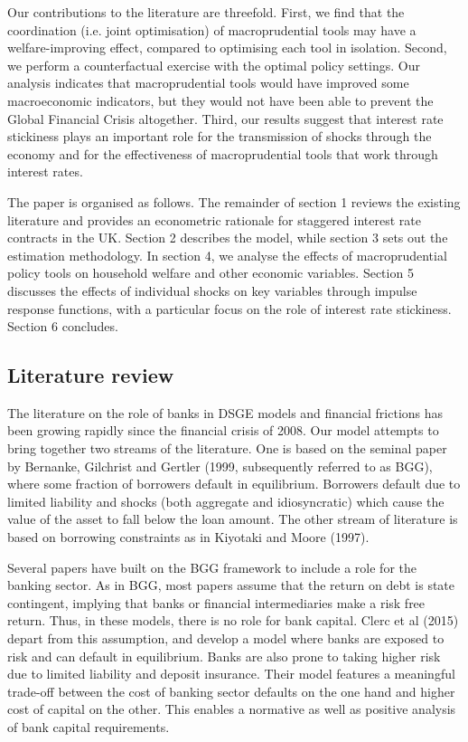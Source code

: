 \documentclass[12pt]{article}
\numberwithin{equation}{section}
\begin{document}
Our contributions to the literature are threefold. First, we find that the coordination (i.e. joint optimisation) of macroprudential tools may have a welfare-improving effect, compared to optimising each tool in isolation. Second, we perform a counterfactual exercise with the optimal policy settings. Our analysis indicates that macroprudential tools would have improved some macroeconomic indicators, but they would not have been able to prevent the Global Financial Crisis altogether. Third, our results suggest that interest rate stickiness plays an important role for the transmission of shocks through the economy and for the effectiveness of macroprudential tools that work through interest rates.

The paper is organised as follows. The remainder of section 1 reviews the existing literature and provides an econometric rationale for staggered interest rate contracts in the UK. Section 2 describes the model, while section 3 sets out the estimation methodology. In section 4, we analyse the effects of macroprudential policy tools on household welfare and other economic variables. Section 5 discusses the effects of individual shocks on key variables through impulse response functions, with a particular focus on the role of interest rate stickiness. Section 6 concludes.



\subsection{Literature review}


The literature on the role of banks in DSGE models and financial frictions has been growing rapidly since the financial crisis of 2008. Our model attempts to bring together two streams of the literature. One is based on the seminal paper by Bernanke, Gilchrist and Gertler (1999, subsequently referred to as BGG), where some fraction of borrowers default in equilibrium. Borrowers default due to limited liability and shocks (both aggregate and idiosyncratic) which cause the value of the asset to fall below the loan amount. The other stream of literature is based on borrowing constraints as in Kiyotaki and Moore (1997).

Several papers have built on the BGG framework to include a role for the banking sector. As in BGG, most papers assume that the return on debt is state contingent, implying that banks or financial intermediaries make a risk free return. Thus, in these models, there is no role for bank capital. Clerc et al (2015) depart from this assumption, and develop a model where banks are exposed to risk and can default in equilibrium. Banks are also prone to taking higher risk due to limited liability and deposit insurance. Their model features a meaningful trade-off between the cost of banking sector defaults on the one hand and higher cost of capital on the other. This enables a normative as well as positive analysis of bank capital requirements. 
\end{document}
